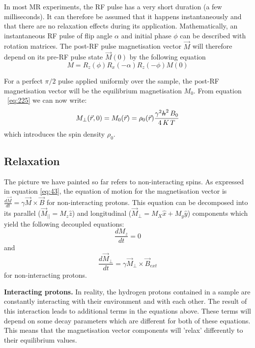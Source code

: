 \hfill

In most MR experiments, the RF pulse has a very short duration (a few milliseconds).
It can therefore be assumed that it happens instantaneously and that there are no relaxation effects during its application.
Mathematically, an instantaneous RF pulse of flip angle $\alpha$ and initial phase $\phi$ can be described with rotation matrices.
The post-RF pulse magnetisation vector $\vec{M}$ will therefore depend on its pre-RF pulse state $\vec{M}(0)$ by the following equation
\begin{equation} \label{eq:445}
    M = R_z(\phi) R_x(-\alpha) R_z(-\phi) M(0)
\end{equation}

For a perfect $\pi/2$ pulse applied uniformly over the sample, the post-RF magnetisation vector will be the equilibrium magnetisation $M_0$. 
From equation ~\ref{eq:225} we can now write:
\begin{equation}\label{eq:93}
    M_{\perp}(\vec{r},0) = M_0(\vec{r}) = \rho_0(\vec{r}) \frac{\gamma^2 \text{\sout{$h$}}^2 \, B_0}{4 \, K \, T}
\end{equation}
which introduces the spin density $\rho_0$.

\hfill

\subsection{Relaxation} \label{app:relaxation}

The picture we have painted so far refers to non-interacting spins.
As expressed in equation \ref{eq:43}, the equation of motion for the magnetisation vector is $\frac{d\vec{M}}{dt} = \gamma \vec{M} \times \vec{B}$  for non-interacting protons. 
This equation can be decomposed into its parallel ($\vec{M}_{||} = M_z \hat{z}$) and longitudinal ($\vec{M}_{\perp} = M_X \hat{x} + M_y \hat{y}$) components which yield the following decoupled equations:
\begin{equation}\label{eq:46}
    \frac{d M_z}{dt} = 0
\end{equation}
and 
\begin{equation}\label{eq:47}
    \frac{d \vec{M}_{\perp}}{dt} = \gamma \vec{M}_{\perp} \times \vec{B}_{ext}
\end{equation}
for non-interacting protons.

\hfill

\textbf{Interacting protons.} In reality, the hydrogen protons contained in a sample are constantly interacting with their environment and with each other.
The result of this interaction leads to additional terms in the equations above.
These terms will depend on some decay parameters which are different for both of these equations.
This means that the magnetisation vector components will 'relax' differently to their equilibrium values.

